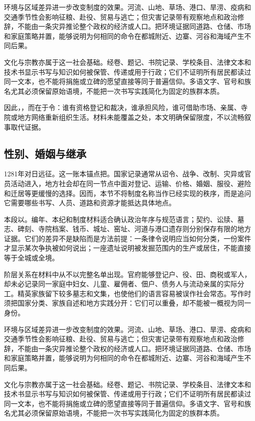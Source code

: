 环境与区域差异进一步改变制度的效果。河流、山地、草场、港口、旱涝、疫病和交通季节性会影响征粮、赴役、贸易与逃亡；但灾害记录带有观察地点和政治修辞，不能由一条灾异推论整个政权的经济或人口。把环境证据同道路、仓储、市场和家庭策略并置，能够说明为何相同的命令在都城附近、边寨、河谷和海域产生不同后果。

文化与宗教亦属于这一社会基础。经卷、题记、书院记录、学校条目、法律文本和技术书显示书写与知识如何被保管、传递或用于行政；它们不证明所有居民都读过同一文本，也不能将捐施或立碑的愿望直接等同于普遍信仰。多语文字、官号和族名尤其必须保留原始语境，不能把一次书写实践简化为固定的族群本质。

因此，，而在于令：谁有资格登记和裁决，谁承担风险，谁可借助市场、亲属、寺院或地方网络重新组织生活。材料未能覆盖之处，本文明确保留限度，不以流畅叙事取代证据。

\subsection{性别、婚姻与继承}

1281年对日远征。这一账本锚点把。国家记录通常从诏令、战争、改制、灾异或官员活动进入，地方社会却在同一节点中面对登记、运输、价格、婚姻、服役、避险和迁居等更缓慢的选择。因而，本节不将制度名称当作已经实现的秩序，而是追问它需要哪些书写、人员、道路和资源才能抵达具体地点。

本段以。编年、本纪和制度材料适合确认政治年序与规范语言；契约、讼牍、墓志、碑刻、寺院档案、钱币、城址、窑址、河道与港口遗存则分别保存有限的地方证据。它们的差异不是缺陷而是方法前提：一条律令说明应当如何分类，一份案件才显示某次争执被如何说出；一座遗址说明被发掘范围内的生产或居住，不能直接等于全城或全境。

阶层关系在材料中从不以完整名单出现。官府能够登记户、役、田、商税或军人，却未必记录同一家庭中妇女、儿童、雇佣者、佃户、债务人与流动亲属的实际分工。精英家族留下较多墓志和文集，也使他们的语言容易被误作社会常态。写作时须把国家分类、家族自述和地方实践分开：它们可以重叠，却不能被一概视为同一身份。

环境与区域差异进一步改变制度的效果。河流、山地、草场、港口、旱涝、疫病和交通季节性会影响征粮、赴役、贸易与逃亡；但灾害记录带有观察地点和政治修辞，不能由一条灾异推论整个政权的经济或人口。把环境证据同道路、仓储、市场和家庭策略并置，能够说明为何相同的命令在都城附近、边寨、河谷和海域产生不同后果。

文化与宗教亦属于这一社会基础。经卷、题记、书院记录、学校条目、法律文本和技术书显示书写与知识如何被保管、传递或用于行政；它们不证明所有居民都读过同一文本，也不能将捐施或立碑的愿望直接等同于普遍信仰。多语文字、官号和族名尤其必须保留原始语境，不能把一次书写实践简化为固定的族群本质。

